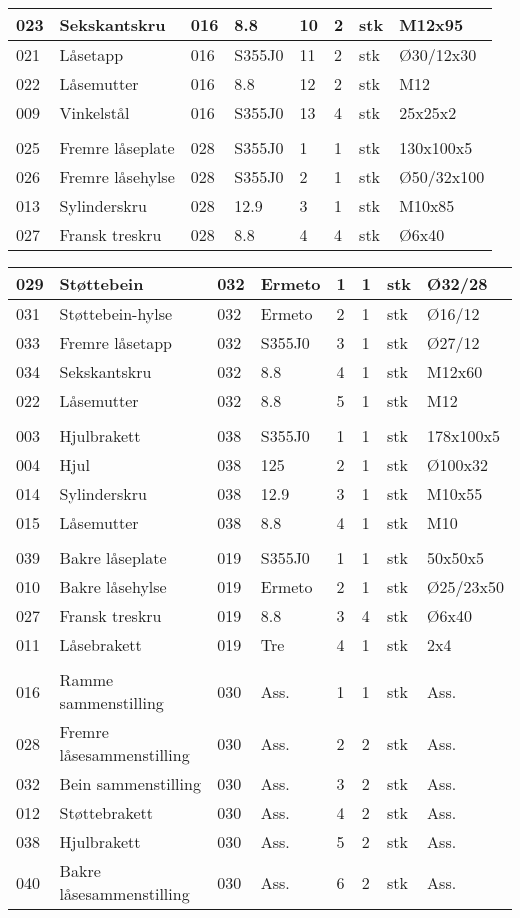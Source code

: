 \begin{tabular}{|l|l|l|l|l|l|l|l|}
023 & Sekskantskru & 016 & 8.8 & 10 & 2 & stk & M12x95\\ \hline
021 & Låsetapp & 016 & S355J0 & 11 & 2 & stk & Ø30/12x30\\ \hline
022 & Låsemutter & 016 & 8.8 & 12 & 2 & stk & M12\\ \hline
009 & Vinkelstål & 016 & S355J0 & 13 & 4 & stk & 25x25x2\\ \hline
 &  &  &  &  &  &  & \\ \hline
025 & Fremre låseplate & 028 & S355J0 & 1 & 1 & stk & 130x100x5\\ \hline
026 & Fremre låsehylse & 028 & S355J0 & 2 & 1 & stk & Ø50/32x100\\ \hline
013 & Sylinderskru & 028 & 12.9 & 3 & 1 & stk & M10x85\\ \hline
027 & Fransk treskru & 028 & 8.8 & 4 & 4 & stk & Ø6x40\\ \hline
\end{tabular}
\begin{tabular}{|l|l|l|l|l|l|l|l|}
\hline
029 & Støttebein & 032 & Ermeto & 1 & 1 & stk & Ø32/28\\ \hline
031 & Støttebein-hylse & 032 & Ermeto & 2 & 1 & stk & Ø16/12\\ \hline
033 & Fremre låsetapp & 032 & S355J0 & 3 & 1 & stk & Ø27/12\\ \hline
034 & Sekskantskru & 032 & 8.8 & 4 & 1 & stk & M12x60\\ \hline
022 & Låsemutter & 032 & 8.8 & 5 & 1 & stk & M12\\ \hline
 &  &  &  &  &  &  & \\ \hline
003 & Hjulbrakett & 038 & S355J0 & 1 & 1 & stk & 178x100x5\\ \hline
004 & Hjul & 038 & 125 & 2 & 1 & stk & Ø100x32\\ \hline
014 & Sylinderskru & 038 & 12.9 & 3 & 1 & stk & M10x55\\ \hline
015 & Låsemutter & 038 & 8.8 & 4 & 1 & stk & M10\\ \hline
 &  &  &  &  &  &  & \\ \hline
039 & Bakre låseplate & 019 & S355J0 & 1 & 1 & stk & 50x50x5\\ \hline
010 & Bakre låsehylse & 019 & Ermeto & 2 & 1 & stk & Ø25/23x50\\ \hline
027 & Fransk treskru & 019 & 8.8 & 3 & 4 & stk & Ø6x40\\ \hline
011 & Låsebrakett & 019 & Tre & 4 & 1 & stk & 2x4\\ \hline
 &  &  &  &  &  &  & \\ \hline
016 & Ramme sammenstilling & 030 & Ass. & 1 & 1 & stk & Ass.\\ \hline
028 & Fremre låsesammenstilling & 030 & Ass. & 2 & 2 & stk & Ass.\\ \hline
032 & Bein sammenstilling & 030 & Ass. & 3 & 2 & stk & Ass.\\ \hline
012 & Støttebrakett & 030 & Ass. & 4 & 2 & stk & Ass.\\ \hline
038 & Hjulbrakett & 030 & Ass. & 5 & 2 & stk & Ass.\\ \hline
040 & Bakre låsesammenstilling & 030 & Ass. & 6 & 2 & stk & Ass.\\ \hline
\end{tabular}
